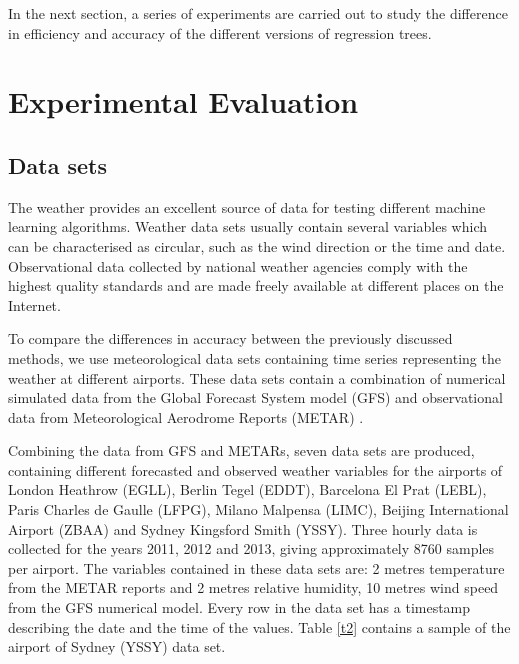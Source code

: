\documentclass[times,twocolumn,final,authoryear]{elsarticle}
\begin{document}
In the next section, a series of experiments are carried out to study the difference in efficiency and accuracy of the different versions of regression trees.


\section{Experimental Evaluation}

\subsection{Data sets}

The weather provides an excellent source of data for testing different machine learning algorithms. Weather data sets usually contain several variables which can be characterised as circular, such as the wind direction or the time and date. Observational data collected by national weather agencies comply with the highest quality standards and are made freely available at different places on the Internet.

To compare the differences in accuracy between the previously discussed methods, we use meteorological data sets containing time series representing the weather at different airports. These data sets contain a combination of numerical simulated data from the Global Forecast System model (GFS) \citep{CampanaCaplan2005} and observational data from Meteorological Aerodrome Reports (METAR) \citep{WMO1995}.

Combining the data from GFS and METARs, seven data sets are produced, containing different forecasted and observed weather variables for the airports of London Heathrow (EGLL), Berlin Tegel (EDDT), Barcelona El Prat (LEBL), Paris Charles de Gaulle (LFPG), Milano Malpensa (LIMC), Beijing International Airport (ZBAA) and Sydney Kingsford Smith (YSSY). Three hourly data is collected for the years 2011, 2012 and 2013, giving approximately 8760 samples per airport. The variables contained in these data sets are: 2 metres temperature from the METAR reports and 2 metres relative humidity, 10 metres wind speed from the GFS numerical model. Every row in the data set has a timestamp describing the date and the time of the values. Table \ref{t2} contains a sample of the airport of Sydney (YSSY) data set.
\end{document}
